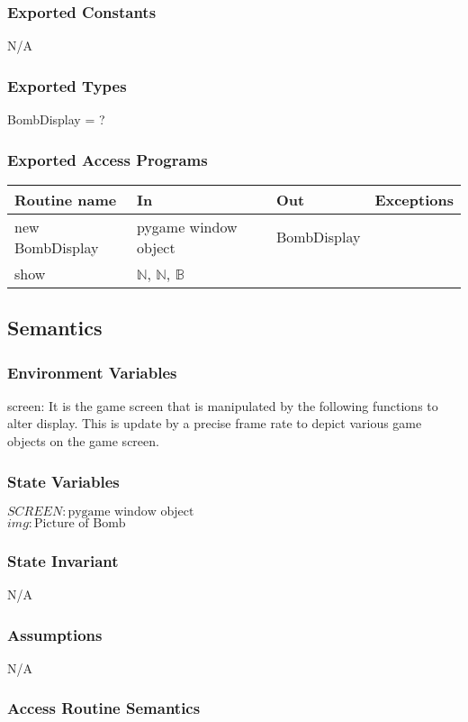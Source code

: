 \documentclass[12pt]{article}
\begin{document}
\subsubsection*{Exported Constants}
N/A
\subsubsection*{Exported Types}
BombDisplay = ?
\subsubsection*{Exported Access Programs}

\begin{tabular}{| l | l | l | l |}
\hline
\textbf{Routine name} & \textbf{In} & \textbf{Out} & \textbf{Exceptions}\\
\hline
new BombDisplay       &pygame window object&     BombDisplay        &           \\
\hline
show       &	 $\mathbb{N}$, $\mathbb{N}$, $\mathbb{B}$    &           &          \\
\hline
\end{tabular}

\subsection*{Semantics}
\subsubsection*{Environment Variables}
screen: It is the game screen that is manipulated by the following functions to alter display. This is update by a precise frame rate to depict various game objects on the game screen.
\subsubsection*{State Variables}
$SCREEN : \text{pygame window object}$\\
$img : \text{Picture of Bomb}$
\subsubsection*{State Invariant}
N/A
\subsubsection*{Assumptions}
N/A
\subsubsection*{Access Routine Semantics}
\end{document}
